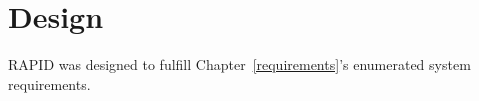 \chapter{Design}
\label{design}

RAPID was designed to fulfill Chapter~\ref{requirements}'s enumerated system requirements.
















\label{design_srid}




